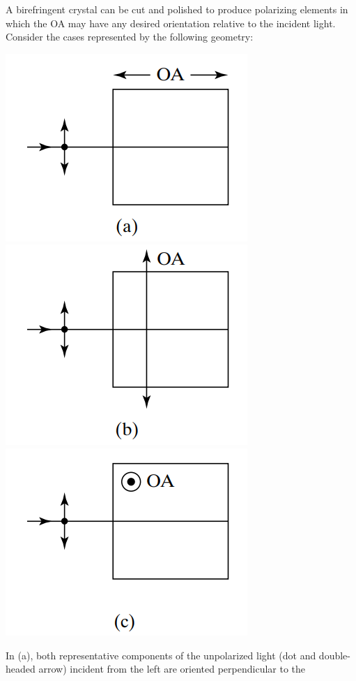 \documentclass[11pt]{book}
\theoremstyle{break}
\theoremstyle{break}
\begin{document}
A birefringent crystal can be cut and polished to produce polarizing elements in which the OA may have any desired orientation relative to the incident light. Consider the cases represented by the following geometry:
\begin{center}
\includegraphics[scale=0.5]{biA.png}\qquad
\includegraphics[scale=0.5]{biC.png}\qquad
\includegraphics[scale=0.5]{biB.png}
\end{center}
In (a), both representative components of the unpolarized light (dot and double-headed arrow) incident from the left are oriented perpendicular to the
\end{document}
